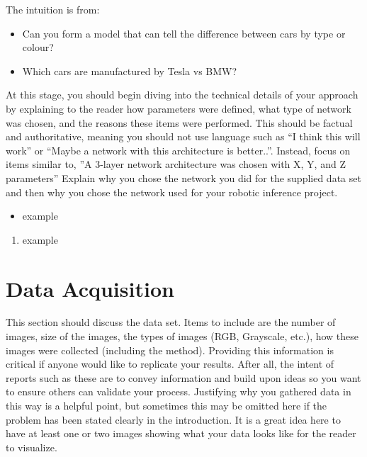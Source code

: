 \documentclass[10pt,journal,compsoc]{IEEEtran}
\begin{document}
 The intuition is from:

\begin{itemize}
\item Can you form a model that can tell the difference between cars by type or colour?
\item Which cars are manufactured by Tesla vs BMW?
\end {itemize}
 
At this stage, you should begin diving into the technical details of your approach by explaining to the reader how parameters were defined, what type of network was chosen, and the reasons these items were performed. This should be factual and authoritative, meaning you should not use language such as “I think this will work” or “Maybe a network with this architecture is better..”. Instead, focus on items similar to, ”A 3-layer network architecture was chosen with X, Y, and Z parameters” 
Explain why you chose the network you did for the supplied data set and then why you chose the network used for your robotic inference project. \cite{lamport1994latex}


\begin{itemize}
\item example
\end {itemize}



\begin{enumerate}
\item example

\end{enumerate}

\section{Data Acquisition}

This section should discuss the data set. Items to include are the number of images, size of the images, the types of images (RGB, Grayscale, etc.), how these images were collected (including the method). Providing this information is critical if anyone would like to replicate your results. After all, the intent of reports such as these are to convey information and build upon ideas so you want to ensure others can validate your process.
Justifying why you gathered data in this way is a helpful point, but sometimes this may be omitted here if the problem has been stated clearly in the introduction.
It is a great idea here to have at least one or two images showing what your data looks like for the reader to visualize.
\end{document}
